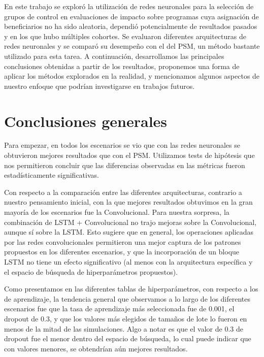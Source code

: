 \documentclass[../main.tex]{subfiles}
\begin{document}
En este trabajo se exploró la utilización de redes neuronales para la selección de grupos
de control en evaluaciones de impacto sobre programas cuya asignación de beneficiarios no
ha sido aleatoria, dependió potencialmente de resultados pasados y en los que hubo
múltiples cohortes. Se evaluaron diferentes arquitecturas de redes neuronales y se comparó
su desempeño con el del PSM, un método bastante utilizado para esta tarea. A continuación,
desarrollamos las principales conclusiones obtenidas a partir de los resultados,
proponemos una forma de aplicar los métodos explorados en la realidad, y mencionamos
algunos aspectos de nuestro enfoque que podrían investigarse en trabajos futuros.

\section{Conclusiones generales}
Para empezar, en todos los escenarios se vio que con las redes neuronales se obtuvieron
mejores resultados que con el PSM. Utilizamos tests de hipótesis que nos permitieron
concluir que las diferencias observadas en las métricas fueron estadísticamente
significativas.

Con respecto a la comparación entre las diferentes arquitecturas, contrario a nuestro
pensamiento inicial, con la que mejores resultados obtuvimos en la gran mayoría de los
escenarios fue la Convolucional. Para nuestra sorpresa, la combinación de LSTM +
Convolucional no trajo mejoras sobre la Convolucional, aunque sí sobre la LSTM. Esto
sugiere que en general, los operaciones aplicadas por las redes convolucionales
permitieron una mejor captura de los patrones propuestos en los diferentes escenarios, y
que la incorporación de un bloque LSTM no tiene un efecto significativo (al menos con la
arquitectura específica y el espacio de búsqueda de hiperparámetros propuestos).

Como presentamos en las diferentes tablas de hiperparámetros, con respecto a los de
aprendizaje, la tendencia general que observamos a lo largo de los diferentes escenarios
fue que la tasa de aprendizaje más seleccionada fue de 0.001, el dropout de 0.3, y que los
valores más elegidos de tamaños de lote lo fueron en menos de la mitad de las
simulaciones. Algo a notar es que el valor de 0.3 de dropout fue el menor dentro del
espacio de búsqueda, lo cual puede indicar que con valores menores, se obtendrían aún
mejores resultados.
\end{document}
